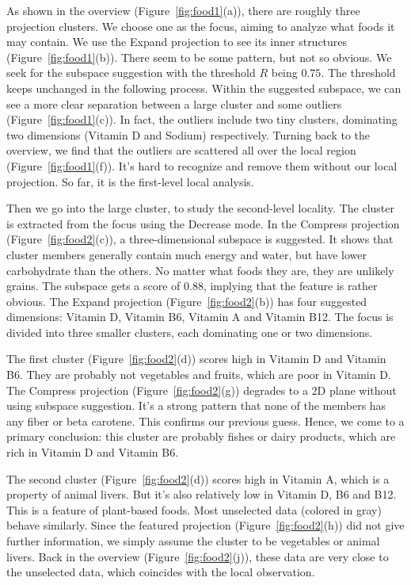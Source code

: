 As shown in the overview (Figure~\ref{fig:food1}(a)), there are roughly three projection clusters. We choose one as the focus, aiming to analyze what foods it may contain. We use the Expand projection to see its inner structures (Figure~\ref{fig:food1}(b)). There seem to be some pattern, but not so obvious. We seek for the subspace suggestion with the threshold $R$ being $0.75$. The threshold keeps unchanged in the following process. Within the suggested subspace, we can see a more clear separation between a large  cluster and some outliers (Figure~\ref{fig:food1}(c)). In fact, the outliers include two tiny clusters, dominating two dimensions (Vitamin D and Sodium) respectively. Turning back to the overview, we find that the outliers are scattered all over the local region (Figure~\ref{fig:food1}(f)). It's hard to recognize and remove them without our local projection. So far, it is the first-level local analysis.

Then we go into the large cluster, to study the second-level locality. The cluster is extracted from the focus using the Decrease mode. In the Compress projection (Figure~\ref{fig:food2}(c)), a three-dimensional subspace is suggested. It shows that cluster members generally contain much energy and water, but have lower carbohydrate than the others. No matter what foods they are, they are unlikely grains. The subspace gets a score of 0.88, implying that the feature is rather obvious. The Expand projection (Figure~\ref{fig:food2}(b)) has four suggested dimensions: Vitamin D, Vitamin B6, Vitamin A and Vitamin B12. The focus is divided into three smaller clusters, each dominating one or two dimensions.

The first cluster (Figure~\ref{fig:food2}(d)) scores high in Vitamin D and Vitamin B6. They are probably not vegetables and fruits, which are poor in Vitamin D. The Compress projection (Figure~\ref{fig:food2}(g)) degrades to a 2D plane without using subspace suggestion. It's a strong pattern that none of the members has any fiber or beta carotene. This confirms our previous guess. Hence, we come to a primary conclusion: this cluster are probably fishes or dairy products, which are rich in Vitamin D and Vitamin B6.

The second cluster (Figure~\ref{fig:food2}(d)) scores high in Vitamin A, which is a property of animal livers. But it's also relatively low in Vitamin D, B6 and B12. This is a feature of plant-based foods. Most unselected data (colored in gray) behave similarly. Since the featured projection (Figure~\ref{fig:food2}(h)) did not give further information, we simply assume the cluster to be vegetables or animal livers. Back in the overview (Figure~\ref{fig:food2}(j)), these data are very close to the unselected data, which coincides with the local observation.

